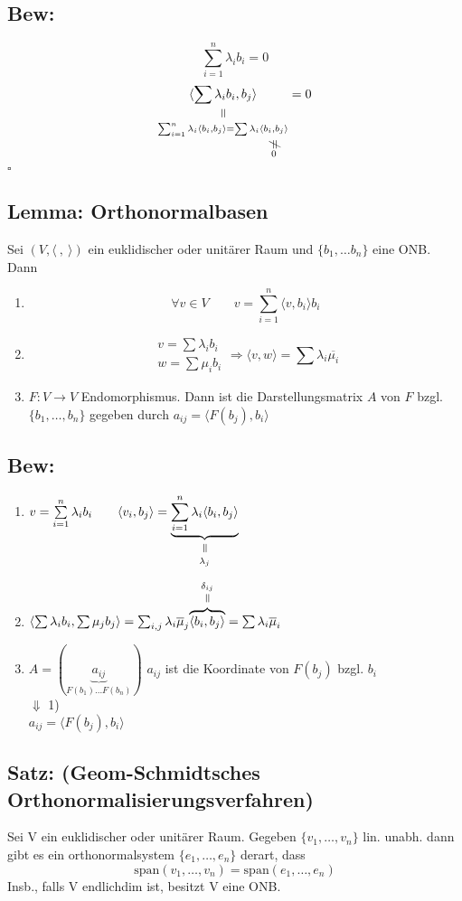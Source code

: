 \documentclass[titlepage,12pt,a4paper,ngerman]{report}
\newenvironment{bew}[1]{\subsection{Bew: #1}}{\hfill$\square$}
\newcommand{\Bew}[2]{\begin{bew}{#1}#2\end{bew}}
\newcommand{\verteq}{\rotatebox{90}{$\,=$}}
\newcommand{\equalto}[2]{\underset{\scriptstyle\overset{\mkern4mu\verteq}{#2}}{#1}}
\newcommand{\equaltoup}[2]{\overset{\scriptstyle\underset{\mkern4mu\verteq}{#2}}{#1}}
\newcommand{\custo}[3]{\underset{\scriptstyle\overset{\mkern4mu\rotatebox{-90}{$\,#1$}}{#3}}{#2}}
\newcommand{\tx}[1]{\textrm{#1}}
\newcommand{\ub}[1]{\underbrace{#1}}
\newcommand{\spa}{\tx{span}}
\newcommand{\summ}[2]{\sum_{#1}^{#2}}
\begin{document}
\Bew{}{$$\summ{i=1}{n}\lambda_i b_i = 0$$
	$$\equalto{\langle \sum \lambda_i b_i, b_j\rangle}{\summ{i=1}{n}\lambda_i \langle b_i, b_j \rangle = \sum \lambda_i \custo{\neq}{\langle b_i,b_j \rangle}{0}} = 0$$%
}
\subsection{Lemma: Orthonormalbasen}
Sei $(V, \langle\ ,\ \rangle)$ ein euklidischer oder unitärer Raum und $\{b_1, \dots b_n \}$ eine ONB. Dann
\begin{enumerate}
	\item $$\forall v \in V \qquad v = \summ{i=1}{n} \langle v,b_i \rangle b_i$$
	\item $$\begin{array}{c} v = \sum \lambda_i b_i \\ w = \sum \mu_i b_i \end{array} \Rightarrow \langle v,w \rangle = \sum \lambda_i \overline{\mu_i}$$
	\item $ F: V \to V $ Endomorphismus. Dann ist die Darstellungsmatrix $ A $ von $ F $ bzgl. $ \{b_1, \dots , b_n\} $ gegeben durch $ a_{ij} = \langle F(b_j),b_i \rangle $
\end{enumerate}

\subsection{Bew:}
\begin{enumerate}[1)]
	\item $ v = \sum\limits_{i=1}^{n} \lambda_i b_i \qquad \langle v_i,b_j \rangle = \equalto{\ub{\sum\limits_{i=1}^{n} \lambda_i \langle b_i, b_j \rangle }}{\lambda_j} $
	\item $ \langle \sum \lambda_i b_i, \sum \mu_j b_j \rangle = \sum_{i,j} \lambda_i \overline{\mu}_j \equaltoup{\overbrace{\langle b_i,b_j \rangle}}{\delta_{ij}} = \sum \lambda_i \overline{\mu}_i $
	\item  $ A = (\ub{a_{ij}}_{F(b_1) \dots F(b_n)}) $ $ a_{ij} $ ist die Koordinate von $ F(b_j) $ bzgl. $ b_i $\\
	$ \Downarrow $ 1)\\
	$ a_{ij} = \langle F(b_j),b_i \rangle $
\end{enumerate}
\subsection{Satz: (Geom-Schmidtsches\\ Orthonormalisierungsverfahren)}
Sei V ein euklidischer oder unitärer Raum. Gegeben $ \{v_1,\dots , v_n \} $ lin. unabh. dann gibt es ein orthonormalsystem $ \{e_1,\dots , e_n \} $ derart, dass
$$\spa(v_1,\dots,v_n) = \spa(e_1,\dots,e_n)$$
Insb., falls V endlichdim ist, besitzt V eine ONB.
\end{document}
